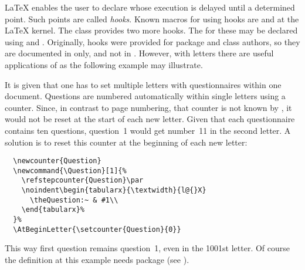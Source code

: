 \begin{Declaration}
\end{Declaration}
{\LaTeX} enables the user to declare  whose execution
is delayed until a determined point. Such points are called
\emph{hooks}. Known macros for using hooks are
 and
 at the \LaTeX{} kernel. The class
 provides two more hooks. The  for
these may be declared using  and
. Originally, hooks were
provided for package and class authors, so they are documented in
\cite{latex:clsguide} only, and not in \cite{latex:usrguide}. However, with
letters there are useful applications of  as the
following example may illustrate.
%
\begin{Example}
  It is given that one has to set multiple letters with questionnaires
  within one document. Questions are numbered automatically within
  single letters using a counter. Since, in contrast to page
  numbering, that counter is not known by , it would
  not be reset at the start of each new letter. Given that each
  questionnaire contains ten questions, question~1 would get number~11
  in the second letter. A solution is to reset this counter at the
  beginning of each new letter:
\begin{lstlisting}
  \newcounter{Question}
  \newcommand{\Question}[1]{%
    \refstepcounter{Question}\par
    \noindent\begin{tabularx}{\textwidth}{l@{}X}
      \theQuestion:~ & #1\\
    \end{tabularx}%
  }%
  \AtBeginLetter{\setcounter{Question}{0}}
\end{lstlisting}
  This way first question remains question~1, even in the 1001st letter. Of
  course the definition at this example needs package
   (see \cite{package:tabularx}).
\end{Example}
%
\EndIndexGroup


